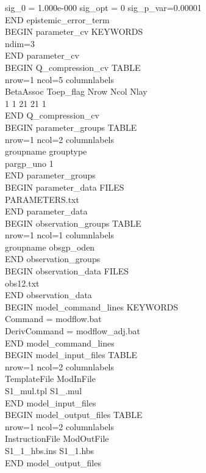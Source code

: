 \documentclass[11pt,oneside,onecolumn]{usgsreport}
\begin{document}
\begin{appendix}
{sig\_0 = 1.000e-000 sig\_opt = 0 sig\_p\_var=0.00001 \\
END epistemic\_error\_term\\
BEGIN parameter\_cv KEYWORDS \\
ndim=3 \\
END parameter\_cv \\
BEGIN Q\_compression\_cv TABLE\\
nrow=1 ncol=5 columnlabels \\
BetaAssoc Toep\_flag Nrow Ncol Nlay \\
1 1 21 21 1 \\
END Q\_compression\_cv\\
BEGIN parameter\_groups TABLE \\
nrow=1 ncol=2 columnlabels\\
groupname grouptype \\
pargp\_uno 1 \\
END parameter\_groups \\
BEGIN parameter\_data FILES \\
PARAMETERS.txt \\
END parameter\_data \\
BEGIN observation\_groups TABLE \\
nrow=1 ncol=1 columnlabels\\
groupname obsgp\_oden \\
END observation\_groups \\
BEGIN observation\_data FILES \\
obs12.txt \\
END observation\_data \\
BEGIN model\_command\_lines KEYWORDS \\
Command = modflow.bat \\
DerivCommand = modflow\_adj.bat \\
END model\_command\_lines \\
BEGIN model\_input\_files TABLE \\
nrow=1 ncol=2 columnlabels \\
TemplateFile ModInFile \\
S1\_mul.tpl S1\_.mul \\
END model\_input\_files \\
BEGIN model\_output\_files TABLE\\
nrow=1 ncol=2 columnlabels\\
InstructionFile ModOutFile\\
S1\_1\_hbs.ins S1\_1.hbs \\
END model\_output\_files \\
}
\end{appendix}
\end{document}
